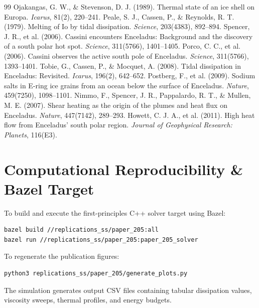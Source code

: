 \documentclass[11pt,a4paper]{article}
\begin{document}
\begin{thebibliography}{99}
 Ojakangas, G. W., \& Stevenson, D. J. (1989). Thermal state of an ice shell on Europa. \textit{Icarus}, 81(2), 220--241.
 Peale, S. J., Cassen, P., \& Reynolds, R. T. (1979). Melting of Io by tidal dissipation. \textit{Science}, 203(4383), 892--894.
 Spencer, J. R., et al. (2006). Cassini encounters Enceladus: Background and the discovery of a south polar hot spot. \textit{Science}, 311(5766), 1401--1405.
 Porco, C. C., et al. (2006). Cassini observes the active south pole of Enceladus. \textit{Science}, 311(5766), 1393--1401.
 Tobie, G., Cassen, P., \& Mocquet, A. (2008). Tidal dissipation in Enceladus: Revisited. \textit{Icarus}, 196(2), 642--652.
 Postberg, F., et al. (2009). Sodium salts in E-ring ice grains from an ocean below the surface of Enceladus. \textit{Nature}, 459(7250), 1098--1101.
 Nimmo, F., Spencer, J. R., Pappalardo, R. T., \& Mullen, M. E. (2007). Shear heating as the origin of the plumes and heat flux on Enceladus. \textit{Nature}, 447(7142), 289--293.
 Howett, C. J. A., et al. (2011). High heat flow from Enceladus' south polar region. \textit{Journal of Geophysical Research: Planets}, 116(E3).
\end{thebibliography}

\appendix
\section{Computational Reproducibility \& Bazel Target}
To build and execute the first-principles C++ solver target using Bazel:
\begin{verbatim}
bazel build //replications_ss/paper_205:all
bazel run //replications_ss/paper_205:paper_205_solver
\end{verbatim}
To regenerate the publication figures:
\begin{verbatim}
python3 replications_ss/paper_205/generate_plots.py
\end{verbatim}
The simulation generates output CSV files containing tabular dissipation values, viscosity sweeps, thermal profiles, and energy budgets.
\end{document}
